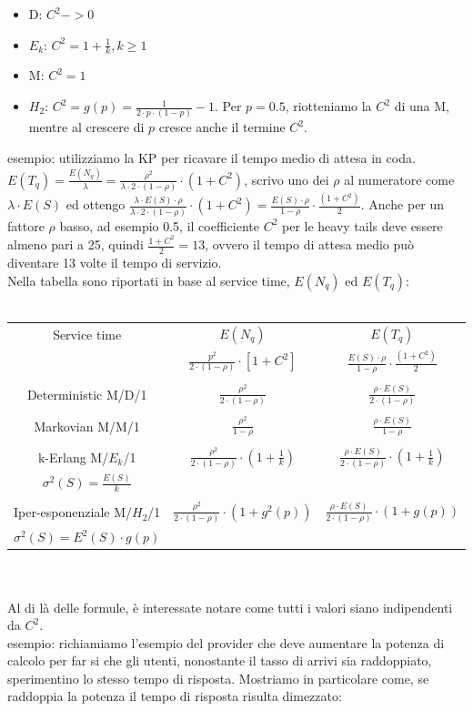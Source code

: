\documentclass{article}
\begin{document}
\begin{itemize}
\item D: $C^2 -> 0$
\item $E_k$: $C^2 = 1 + \frac{1}{k}, k \geq 1$
\item M: $C^2 = 1$
\item $H_2$: $C^2 = g(p) = \frac{1}{2\cdot p\cdot(1-p)} - 1$. Per $p = 0.5$, riotteniamo la $C^2$ di una M, mentre al crescere di $p$ cresce anche il termine $C^2$.
\end{itemize}
esempio: utilizziamo la KP per ricavare il tempo medio di attesa in coda. $E(T_q) = \frac{E(N_q)}{\lambda} = \frac{\rho^2}{\lambda\cdot 2\cdot(1-\rho)}\cdot(1 + C^2)$, scrivo uno dei $\rho$ al numeratore come $\lambda\cdot E(S)$ ed ottengo $\frac{\lambda\cdot E(S)\cdot \rho}{\lambda\cdot 2\cdot(1 - \rho)}\cdot (1 + C^2) = \frac{E(S)\cdot \rho}{1 - \rho}\cdot \frac{(1 + C^2)}{2}$. Anche per un fattore $\rho$ basso, ad esempio 0.5, il coefficiente $C^2$ per le heavy tails deve essere almeno pari a 25, quindi $\frac{1 + C^2}{2} = 13$, ovvero il tempo di attesa medio può diventare 13 volte il tempo di servizio.\\Nella tabella sono riportati in base al service time, $E(N_q)$ ed $E(T_q)$:\\\\
\begin{tabular}{ |c|c|c| }
\hline
Service time & $E(N_q)$ & $E(T_q)$\\
 & $\frac{p^2}{2\cdot (1 - \rho)} \cdot [1 + C^2]$ & $\frac{E(S)\cdot \rho}{1 - \rho}\cdot \frac{(1 + C^2)}{2}$\\
 &  & \\
Deterministic M/D/1 & $\frac{\rho^2}{2\cdot(1 - \rho)}$ & $\frac{\rho\cdot E(S)}{2\cdot(1 - \rho)}$\\
 &  & \\
Markovian M/M/1 & $\frac{\rho^2}{1 - \rho}$ & $\frac{\rho\cdot E(S)}{1 - \rho}$\\
 &  & \\
k-Erlang M/$E_k$/1 & $\frac{\rho^2}{2\cdot(1 - \rho)}\cdot (1 + \frac{1}{k})$ & $\frac{\rho\cdot E(S)}{2\cdot(1 - \rho)}\cdot (1 + \frac{1}{k})$\\
$\sigma^2(S) = \frac{E(S)}{k}$ &  & \\
 & & \\
Iper-esponenziale M/$H_2$/1 & $\frac{\rho^2}{2\cdot(1 - \rho)}\cdot(1 + g^2(p))$ & $\frac{\rho\cdot E(S)}{2\cdot(1 - \rho)}\cdot(1 + g(p))$\\ 
$\sigma^2(S) = E^2(S)\cdot g(p)$ &  &  \\
\hline
\end{tabular}\\\\ Al di là delle formule, è interessate notare come tutti i valori siano indipendenti da $C^2$.\\ esempio: richiamiamo l'esempio del provider che deve aumentare la potenza di calcolo per far si che gli utenti, nonostante il tasso di arrivi sia raddoppiato, sperimentino lo stesso tempo di risposta. Mostriamo in particolare come, se raddoppia la potenza il tempo di risposta risulta dimezzato:
\end{document}
